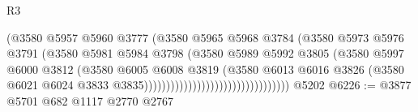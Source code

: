 \begin{lexlean}{R3}
\begin{coremodule}
                                                    (@3580
                                                      @5957
                                                      @5960
                                                      @3777
                                                      (@3580
                                                        @5965
                                                        @5968
                                                        @3784
                                                        (@3580
                                                          @5973
                                                          @5976
                                                          @3791
                                                          (@3580
                                                            @5981
                                                            @5984
                                                            @3798
                                                            (@3580
                                                              @5989
                                                              @5992
                                                              @3805
                                                              (@3580
                                                                @5997
                                                                @6000
                                                                @3812
                                                                (@3580
                                                                  @6005
                                                                  @6008
                                                                  @3819
                                                                  (@3580
                                                                    @6013
                                                                    @6016
                                                                    @3826
                                                                    (@3580
                                                                      @6021
                                                                      @6024
                                                                      @3833
                                                                      @3835)))))))))))))))))))))))))))))))))
    @5202
@6226 := @3877 @5701 @682 @1117 @2770 @2767

\end{coremodule}
\end{lexlean}
